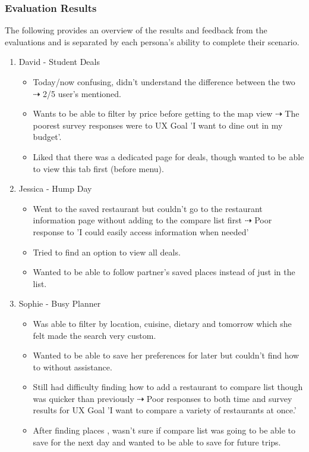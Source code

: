 \documentclass[a4 paper, 12pt]{article}
\begin{document}
    \subsubsection{Evaluation Results}
    The following provides an overview of the results and feedback from the evaluations and is separated by each persona's ability to complete their scenario. 
        \begin{enumerate}
            \item David - Student Deals
                \begin{itemize}
                    \item Today/now confusing, didn't understand the difference between the two $\dashrightarrow$ 2/5 user's mentioned.
                    \item Wants to be able to filter by price before getting to the map view $\dashrightarrow$ The poorest survey responses were to UX Goal 'I want to dine out in my budget'.
                    \item Liked that there was a dedicated page for deals, though wanted to be able to view this tab first (before menu).
                \end{itemize}

            \item Jessica - Hump Day
                \begin{itemize}
                    \item Went to the saved restaurant but couldn't go to the restaurant information page without adding to the compare list first $\dashrightarrow$ Poor response to 'I could easily access information when needed'
                    \item Tried to find an option to view all deals.
                    \item Wanted to be able to follow partner's saved places instead of just in the list. 
                \end{itemize}

            \item Sophie - Busy Planner
                \begin{itemize}             
                    \item Was able to filter by location, cuisine,  dietary and tomorrow which she felt made the search very custom.
                    \item Wanted to be able to save her preferences for later but couldn't find how to without assistance.
                    \item Still had difficulty finding how to add a restaurant to compare list though was quicker than previously $\dashrightarrow$ Poor responses to both time and survey results for UX Goal 'I want to compare a variety of restaurants at once.'
                    \item After finding places , wasn't sure if compare list was going to be able to save for the next day and wanted to be able to save for future trips. 
                \end{itemize}


\end{enumerate}
\end{document}
